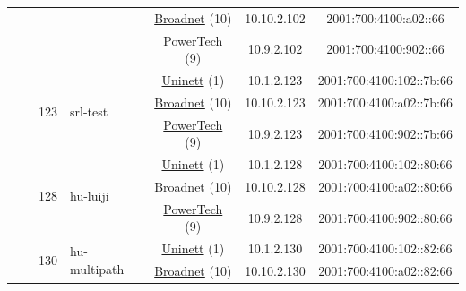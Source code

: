 \begin{small}
\begin{center}
\begin{longtable}{|c|c|c|c|c|c|c|c|}
  &  & \multicolumn{2}{|c|}{} & \multicolumn{2}{|c|}{\tiny{\href{https://www.broadnet.no}{Broadnet} (10)}} & \tiny{10.10.2.102} & \tiny{2001:700:4100:a02::66} \\* \cline{5-5}\cline{6-6}\cline{7-7}\cline{8-8}
  &  & \multicolumn{2}{|c|}{} & \multicolumn{2}{|c|}{\tiny{\href{http://www.powertech.no}{PowerTech} (9)}} & \tiny{10.9.2.102} & \tiny{2001:700:4100:902::66} \\* \cline{3-3}\cline{4-4}\cline{5-5}\cline{6-6}\cline{7-7}\cline{8-8}
  &  & \multirow{3}{*}{\tiny{123}} & \multicolumn{1}{|l|}{\multirow{3}{*}{\tiny{srl-test}}} & \multicolumn{2}{|c|}{\tiny{\href{https://www.uninett.no}{Uninett} (1)}} & \tiny{10.1.2.123} & \tiny{2001:700:4100:102::7b:66} \\* \cline{5-5}\cline{6-6}\cline{7-7}\cline{8-8}
  &  &  &  & \multicolumn{2}{|c|}{\tiny{\href{https://www.broadnet.no}{Broadnet} (10)}} & \tiny{10.10.2.123} & \tiny{2001:700:4100:a02::7b:66} \\* \cline{5-5}\cline{6-6}\cline{7-7}\cline{8-8}
  &  &  &  & \multicolumn{2}{|c|}{\tiny{\href{http://www.powertech.no}{PowerTech} (9)}} & \tiny{10.9.2.123} & \tiny{2001:700:4100:902::7b:66} \\* \cline{3-3}\cline{4-4}\cline{5-5}\cline{6-6}\cline{7-7}\cline{8-8}
  &  & \multirow{3}{*}{\tiny{128}} & \multicolumn{1}{|l|}{\multirow{3}{*}{\tiny{hu-luiji}}} & \multicolumn{2}{|c|}{\tiny{\href{https://www.uninett.no}{Uninett} (1)}} & \tiny{10.1.2.128} & \tiny{2001:700:4100:102::80:66} \\* \cline{5-5}\cline{6-6}\cline{7-7}\cline{8-8}
  &  &  &  & \multicolumn{2}{|c|}{\tiny{\href{https://www.broadnet.no}{Broadnet} (10)}} & \tiny{10.10.2.128} & \tiny{2001:700:4100:a02::80:66} \\* \cline{5-5}\cline{6-6}\cline{7-7}\cline{8-8}
  &  &  &  & \multicolumn{2}{|c|}{\tiny{\href{http://www.powertech.no}{PowerTech} (9)}} & \tiny{10.9.2.128} & \tiny{2001:700:4100:902::80:66} \\* \cline{3-3}\cline{4-4}\cline{5-5}\cline{6-6}\cline{7-7}\cline{8-8}
  &  & \multirow{3}{*}{\tiny{130}} & \multicolumn{1}{|l|}{\multirow{3}{*}{\tiny{hu-multipath}}} & \multicolumn{2}{|c|}{\tiny{\href{https://www.uninett.no}{Uninett} (1)}} & \tiny{10.1.2.130} & \tiny{2001:700:4100:102::82:66} \\* \cline{5-5}\cline{6-6}\cline{7-7}\cline{8-8}
  &  &  &  & \multicolumn{2}{|c|}{\tiny{\href{https://www.broadnet.no}{Broadnet} (10)}} & \tiny{10.10.2.130} & \tiny{2001:700:4100:a02::82:66} \\* \cline{5-5}\cline{6-6}\cline{7-7}\cline{8-8}

\end{longtable}
\end{center}
\end{small}
